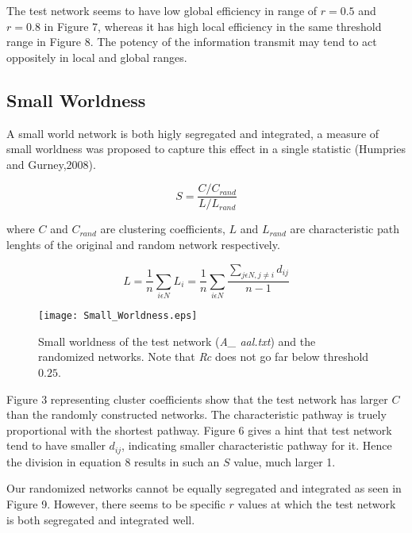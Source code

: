 \documentclass[12pt]{article}
\begin{document}
The test network seems to have low global efficiency in range of $r=0.5$ and $r=0.8$ in Figure 7, whereas it has high local efficiency in the same threshold range in Figure 8. The potency of the information transmit may tend to act oppositely in local and global ranges. 


\newpage

\subsection{Small Worldness}

A small world network is both higly segregated and integrated, a measure of small worldness was proposed to capture this effect in a single statistic (Humpries and Gurney,2008).

\begin{equation}
S = \frac{C/C_{rand}}{L/L_{rand}}
\end{equation}
 
 where $C$ and $C_{rand}$ are clustering coefficients, $L$ and $L_{rand}$ are characteristic path lenghts of the original and random network respectively. 

\begin{equation}
L = \frac{1}{n}\sum\limits_{i \epsilon N} L_i = \frac{1}{n}\sum\limits_{i \epsilon N} \frac{\sum\limits_{j \epsilon N, j \neq i }d_{ij}}{n-1 } 
\end{equation}

\begin{figure}[h!]
	\centering
	\texttt{[image: Small\_Worldness.eps]}
	\caption{Small worldness of the test network (\textit{A\_ aal.txt}) and the randomized networks. Note that \textit{Rc} does not go far below threshold $0.25$.}
\end{figure}

Figure 3 representing cluster coefficients show that the test network has larger $C$ than the randomly constructed networks. The characteristic pathway is truely proportional with the shortest pathway. Figure 6 gives a hint that test network tend to have smaller $d_{ij}$, indicating smaller characteristic pathway for it. Hence the division in equation 8 results in such an $S$ value, much larger 1.

 Our randomized networks cannot be equally segregated and integrated as seen in Figure 9. However, there seems to be specific $r$ values at which the test network is both segregated and integrated well.  

\newpage
\end{document}
